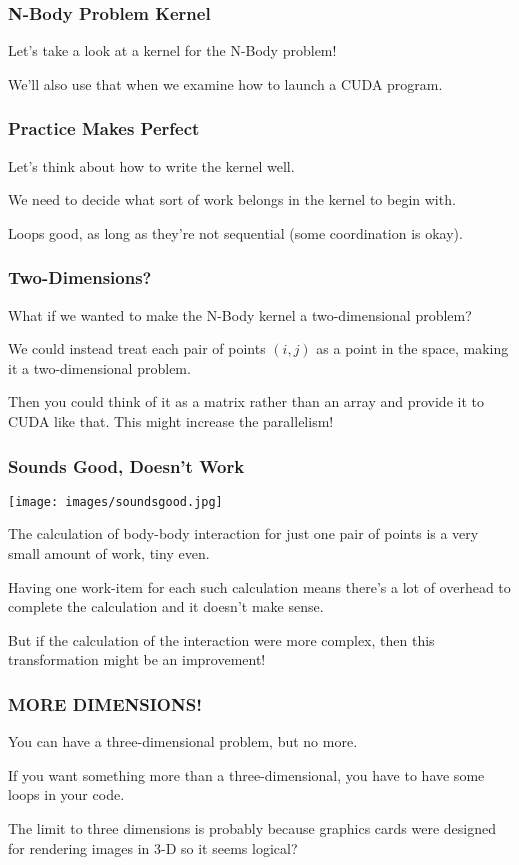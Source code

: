 \begin{frame}
\frametitle{N-Body Problem Kernel}

Let's take a look at a kernel for the N-Body problem!

We'll also use that when we examine how to launch a CUDA program.

\end{frame}


\begin{frame}
\frametitle{Practice Makes Perfect}
Let's think about how to write the kernel well.

We need to decide what sort of work belongs in the kernel to begin with.

Loops good, as long as they're not sequential (some coordination is okay).

\end{frame}


\begin{frame}
\frametitle{Two-Dimensions?}

What if we wanted to make the N-Body kernel a two-dimensional problem? 

We could instead treat each pair of points $(i, j)$ as a point in the space, making it a two-dimensional problem. 

Then you could think of it as a matrix rather than an array and provide it to CUDA like that. This might increase the parallelism! 


\end{frame}


\begin{frame}
\frametitle{Sounds Good, Doesn't Work}


\begin{center}
	\texttt{[image: images/soundsgood.jpg]}
\end{center}

The calculation of body-body interaction for just one pair of points is a very small amount of work, tiny even. 

Having one work-item for each such calculation means there's a lot of overhead to complete the calculation and it doesn't make sense. 

But if the calculation of the interaction were more complex, then this transformation might be an improvement!

\end{frame}

\begin{frame}
\frametitle{MORE DIMENSIONS!}

You can have a three-dimensional problem, but no more.

If you want something more than a three-dimensional, you have to have some loops in your code.

The limit to three dimensions is probably because graphics cards were designed for rendering images in 3-D so it seems logical?

\end{frame}


